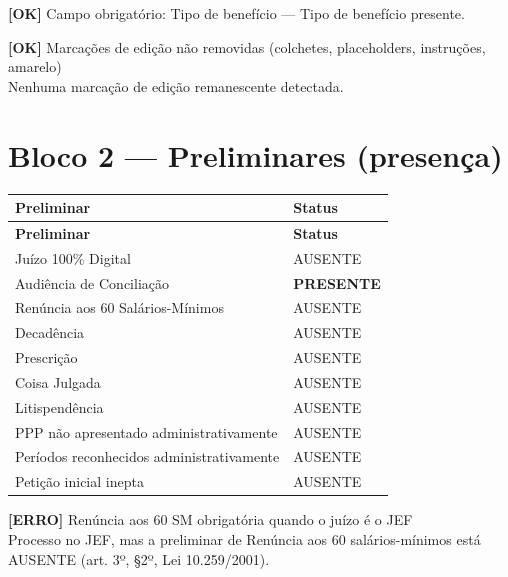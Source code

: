 \documentclass[12pt,a4paper]{article}
\newcommand{\statusOK}[1]{\textcolor{corOK}{\textbf{[OK]}} #1}
\newcommand{\statusERRO}[1]{\textcolor{corERRO}{\textbf{[ERRO]}} #1}
\begin{document}
\medskip
\statusOK{Campo obrigatório: Tipo de benefício} --- Tipo de benefício presente.

\medskip
\statusOK{Marcações de edição não removidas (colchetes, placeholders, instruções, amarelo)}\\
Nenhuma marcação de edição remanescente detectada.

\section{Bloco 2 --- Preliminares (presença)}

\begin{longtable}{p{8.5cm} p{4.5cm}}
  \toprule
  \textbf{Preliminar} & \textbf{Status} \\
  \midrule
  \endfirsthead
  \toprule
  \textbf{Preliminar} & \textbf{Status} \\
  \midrule
  \endhead
  Juízo 100\% Digital                           & AUSENTE \\
  Audiência de Conciliação                      & \textcolor{corOK}{\textbf{PRESENTE}} \\
  Renúncia aos 60 Salários-Mínimos              & AUSENTE \\
  Decadência                                    & AUSENTE \\
  Prescrição                                    & AUSENTE \\
  Coisa Julgada                                 & AUSENTE \\
  Litispendência                                & AUSENTE \\
  PPP não apresentado administrativamente       & AUSENTE \\
  Períodos reconhecidos administrativamente     & AUSENTE \\
  Petição inicial inepta                        & AUSENTE \\
  \bottomrule
\end{longtable}

\statusERRO{Renúncia aos 60 SM obrigatória quando o juízo é o JEF}\\
Processo no JEF, mas a preliminar de Renúncia aos 60 salários-mínimos está AUSENTE (art. 3º, §2º, Lei 10.259/2001).

\end{document}
